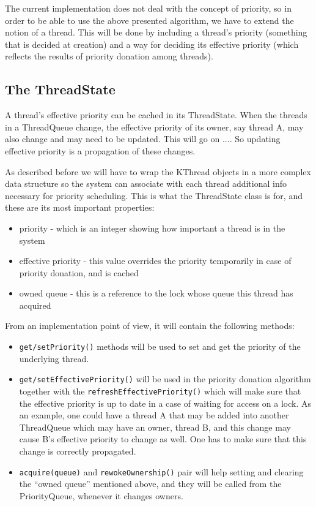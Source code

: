 \documentclass[a4paper,10pt]{article}
\begin{document}
The current implementation does not deal with the concept of priority, so in order to be able to use the above presented algorithm, we have to extend the notion of a thread. This will be done by including a thread's priority (something that is decided at creation) and a way for deciding its effective priority (which reflects the results of priority donation among threads).

\subsection{The ThreadState}

 A thread's effective priority can be cached in its 
ThreadState. When the threads in a ThreadQueue change, the effective priority of its owner, 
say thread A, may also change and may need to be updated.  This will go on .... So updating effective priority is a 
propagation of these changes.

As described before we will have to wrap the KThread objects in a more complex data structure so the system can associate with each thread additional info necessary for priority scheduling. This is what the ThreadState class is for, and these are its most important properties:
\begin{itemize}
\item priority - which is an integer showing how important a thread is in the system
\item effective priority - this value overrides the priority temporarily in case of priority donation, and is cached 
\item owned queue - this is a reference to the lock whose queue this thread has acquired
\end{itemize}

From an implementation point of view, it will contain the following methods:
\begin{itemize}
\item \texttt{get/setPriority()} methods will be used to set and get the priority of the underlying thread.
\item \texttt{get/setEffectivePriority()} will be used in the priority donation algorithm together with the \texttt{refreshEffectivePriority()} which will make sure that the effective priority is up to date in a case of waiting for access on a lock. As an example, one could have a thread A that may be added into another ThreadQueue which may have an owner, thread B, and this change may cause B's effective priority to change as well. One has to make sure that this change is correctly propagated.
\item \texttt{acquire(queue)} and \texttt{rewokeOwnership()} pair will help setting and clearing the ``owned queue'' mentioned above, and they will be called from the PriorityQueue, whenever it changes owners.
\end{itemize}
\end{document}
